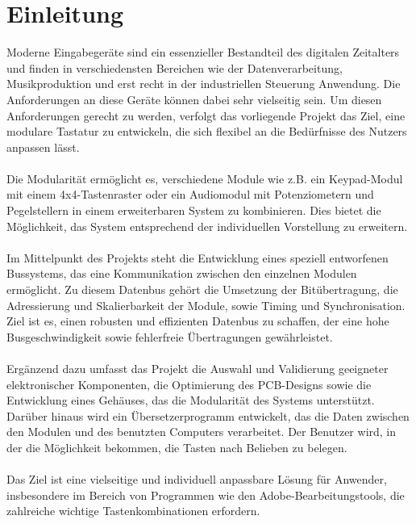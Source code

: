 \chapter{Einleitung}
Moderne Eingabegeräte sind ein essenzieller Bestandteil des digitalen Zeitalters und finden in verschiedensten Bereichen wie der Datenverarbeitung, Musikproduktion und erst recht in der industriellen Steuerung Anwendung. Die Anforderungen an diese Geräte können dabei sehr vielseitig sein. Um diesen Anforderungen gerecht zu werden, verfolgt das vorliegende Projekt das Ziel, eine modulare Tastatur zu entwickeln, die sich flexibel an die Bedürfnisse des Nutzers anpassen lässt.
\\
\\
Die Modularität ermöglicht es, verschiedene Module wie z.B. ein Keypad-Modul mit einem 4x4-Tastenraster oder ein Audiomodul mit Potenziometern und Pegelstellern in einem erweiterbaren System zu kombinieren. Dies bietet die Möglichkeit, das System entsprechend der individuellen Vorstellung zu erweitern.
\\
\\
Im Mittelpunkt des Projekts steht die Entwicklung eines speziell entworfenen Bussystems, das eine Kommunikation zwischen den einzelnen Modulen ermöglicht. Zu diesem Datenbus gehört die Umsetzung der Bitübertragung, die Adressierung und Skalierbarkeit der Module, sowie Timing und Synchronisation. Ziel ist es, einen robusten und effizienten Datenbus zu schaffen, der eine hohe Busgeschwindigkeit sowie fehlerfreie Übertragungen gewährleistet.
\\
\\
Ergänzend dazu umfasst das Projekt die Auswahl und Validierung geeigneter elektronischer Komponenten, die Optimierung des PCB-Designs sowie die Entwicklung eines Gehäuses, das die Modularität des Systems unterstützt. Darüber hinaus wird ein Übersetzerprogramm entwickelt, das die Daten zwischen den Modulen und des benutzten Computers verarbeitet. Der Benutzer wird, in der die Möglichkeit bekommen, die Tasten nach Belieben zu belegen.
\\
\\
Das Ziel ist eine vielseitige und individuell anpassbare Lösung für Anwender, insbesondere im Bereich von Programmen wie den Adobe-Bearbeitungstools, die zahlreiche wichtige Tastenkombinationen erfordern.
\newpage